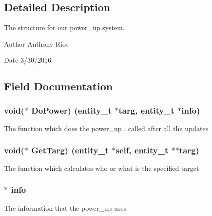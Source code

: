 \subsection{Detailed Description}
The structure for our power\+\_\+up system.

\begin{DoxyAuthor}{Author}
Anthony Rios 
\end{DoxyAuthor}
\begin{DoxyDate}{Date}
3/30/2016 
\end{DoxyDate}


\subsection{Field Documentation}
\subsubsection[{\texorpdfstring{Do\+Power}{DoPower}}]{\setlength{\rightskip}{0pt plus 5cm}void($\ast$ Do\+Power) ({\bf entity\+\_\+t} $\ast$targ, {\bf entity\+\_\+t} $\ast${\bf info})}\hypertarget{structpower__s_a0547996a48a142c5c5006ce1dd3020a5}{}\label{structpower__s_a0547996a48a142c5c5006ce1dd3020a5}
The function which does the power\+\_\+up , called after all the updates 
\subsubsection[{\texorpdfstring{Get\+Targ}{GetTarg}}]{\setlength{\rightskip}{0pt plus 5cm}void($\ast$ Get\+Targ) ({\bf entity\+\_\+t} $\ast$self, {\bf entity\+\_\+t} $\ast$$\ast$targ)}\hypertarget{structpower__s_a8e7faa42ca042b4df438d3c82427d2ee}{}\label{structpower__s_a8e7faa42ca042b4df438d3c82427d2ee}
The function which calculates who or what is the specified target 
\subsubsection[{\texorpdfstring{info}{info}}]{$\ast$ info}\hypertarget{structpower__s_abdbfaddb317fd1c7b9bdd58ea49d0395}{}\label{structpower__s_abdbfaddb317fd1c7b9bdd58ea49d0395}
The information that the power\+\_\+up uses 
